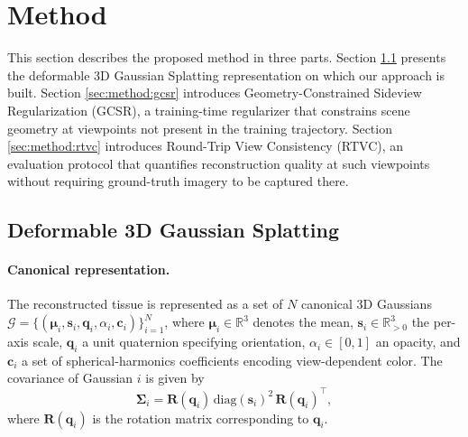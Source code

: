 %
%
%   
%

\section{Method}
\label{sec:method}

This section describes the proposed method in three parts. Section
\ref{sec:method:3dgs} presents the deformable 3D Gaussian Splatting
representation on which our approach is built. Section
\ref{sec:method:gcsr} introduces Geometry-Constrained Sideview
Regularization (GCSR), a training-time regularizer that constrains scene
geometry at viewpoints not present in the training trajectory. Section
\ref{sec:method:rtvc} introduces Round-Trip View Consistency (RTVC), an
evaluation protocol that quantifies reconstruction quality at such
viewpoints without requiring ground-truth imagery to be captured there.

\subsection{Deformable 3D Gaussian Splatting}
\label{sec:method:3dgs}

\paragraph{Canonical representation.}
The reconstructed tissue is represented as a set of $N$ canonical 3D
Gaussians $\mathcal{G} = \{(\boldsymbol{\mu}_i, \mathbf{s}_i, \mathbf{q}_i,
\alpha_i, \mathbf{c}_i)\}_{i=1}^{N}$, where $\boldsymbol{\mu}_i \in
\mathbb{R}^3$ denotes the mean, $\mathbf{s}_i \in \mathbb{R}^3_{>0}$ the
per-axis scale, $\mathbf{q}_i$ a unit quaternion specifying orientation,
$\alpha_i \in [0,1]$ an opacity, and $\mathbf{c}_i$ a set of
spherical-harmonics coefficients encoding view-dependent color. The
covariance of Gaussian $i$ is given by
\begin{equation}
\boldsymbol{\Sigma}_i = \mathbf{R}(\mathbf{q}_i)\,\mathrm{diag}(\mathbf{s}_i)^2\,\mathbf{R}(\mathbf{q}_i)^\top ,
\end{equation}
where $\mathbf{R}(\mathbf{q}_i)$ is the rotation matrix corresponding to
$\mathbf{q}_i$.

